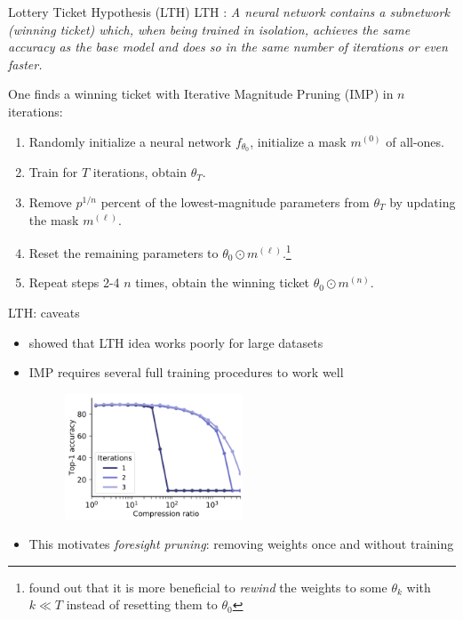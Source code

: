 \documentclass[10pt, handout]{beamer}
\begin{document}
\begin{frame}{Lottery Ticket Hypothesis (LTH)}
\pause
LTH \cite{LTH}: \textit{A neural network contains a subnetwork (winning ticket) which, when being trained in isolation, achieves the same accuracy as the base model and does so in the same number of iterations or even faster.}

\medskip
\pause

One finds a winning ticket with Iterative Magnitude Pruning (IMP) in $n$ iterations:
\begin{enumerate}
    \pause\item Randomly initialize a neural network $f_{\theta_0}$, initialize a mask $m^{(0)}$ of all-ones.
    \pause\item Train for $T$ iterations, obtain $\theta_T$.
    \pause\item Remove $p^{1/n}$ percent of the lowest-magnitude parameters from $\theta_T$ by updating the mask $m^{(\ell)}$.
    \pause\item Reset the remaining parameters to $\theta_0 \odot m^{(\ell)}$.\footnote{\cite{Stabilizing_LTH} found out that it is more beneficial to \textit{rewind} the weights to some $\theta_k$ with $k \ll T$ instead of resetting them to $\theta_0$}
    \pause\item Repeat steps 2-4 $n$ times, obtain the winning ticket $\theta_0 \odot m^{(n)}$.
\end{enumerate}
\end{frame}


\begin{frame}{LTH: caveats}
\begin{itemize}
    \pause\item \cite{State_of_sparsity, Rethinking_Pruning} showed that LTH idea works poorly for large datasets
    \pause\item IMP requires several full training procedures to work well
    \begin{figure}
        \centering
        \includegraphics[width=0.5\textwidth]{images/imp-num-iters.png}
        \label{fig:imp-num-iters}
    \end{figure}
    \pause\item This motivates \textit{foresight pruning}: removing weights once and without training \cite{SNIP, GraSP, SynFlow}
\end{itemize}
\end{frame}
\end{document}
